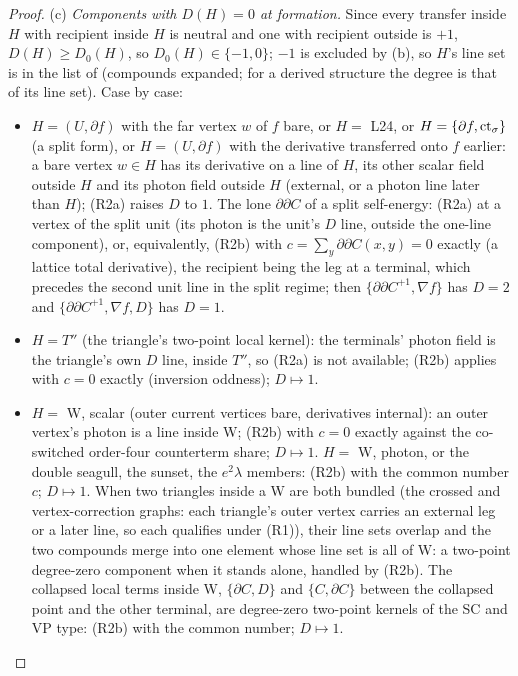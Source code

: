 \begin{proof}
(c) \emph{Components with $D(H)=0$ at formation.} Since every transfer inside $H$ with recipient inside $H$ is neutral and one with recipient outside is $+1$, $D(H)\ge D_0(H)$, so $D_0(H)\in\{-1,0\}$; $-1$ is excluded by (b), so $H$'s line set is in the list of  (compounds expanded; for a derived structure the degree is that of its line set). Case by case:
\begin{itemize}[nosep,leftmargin=*]
\item $H=(U,\partial f)$ with the far vertex $w$ of $f$ bare, or $H=$ L24, or $H=\{\partial f,{\rm ct}_\sigma\}$ (a split form), or $H=(U,\partial f)$ with the derivative transferred onto $f$ earlier: a bare vertex $w\in H$ has its derivative on a line of $H$, its other scalar field outside $H$ and its photon field outside $H$ (external, or a photon line later than $H$); (R2a) raises $D$ to $1$. The lone $\partial\partial C$ of a split self-energy: (R2a) at a vertex of the split unit (its photon is the unit's $D$ line, outside the one-line component), or, equivalently, (R2b) with $c=\sum_y\partial\partial C(x,y)=0$ exactly (a lattice total derivative), the recipient being the leg at a terminal, which precedes the second unit line in the split regime; then $\{\partial\partial C^{+1},\nabla f\}$ has $D=2$ and $\{\partial\partial C^{+1},\nabla f,D\}$ has $D=1$.
\item $H=T''$ (the triangle's two-point local kernel): the terminals' photon field is the triangle's own $D$ line, inside $T''$, so (R2a) is not available; (R2b) applies with $c=0$ exactly (inversion oddness); $D\mapsto1$.
\item $H=$ W, scalar (outer current vertices bare, derivatives internal): an outer vertex's photon is a line inside W; (R2b) with $c=0$ exactly against the co-switched order-four counterterm share; $D\mapsto1$. $H=$ W, photon, or the double seagull, the sunset, the $e^2\lambda$ members: (R2b) with the common number $c$; $D\mapsto1$. When two triangles inside a W are both bundled (the crossed and vertex-correction graphs: each triangle's outer vertex carries an external leg or a later line, so each qualifies under (R1)), their line sets overlap and the two compounds merge into one element whose line set is all of W: a two-point degree-zero component when it stands alone, handled by (R2b). The collapsed local terms inside W, $\{\partial C,D\}$ and $\{C,\partial C\}$ between the collapsed point and the other terminal, are degree-zero two-point kernels of the SC and VP type: (R2b) with the common number; $D\mapsto1$.

\end{itemize}
\end{proof}
